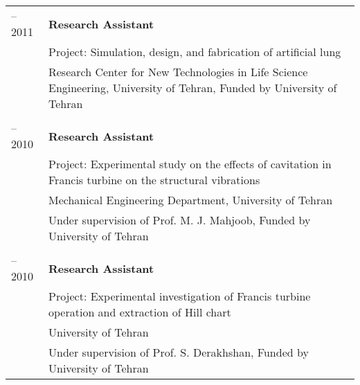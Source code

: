 \begin{longtable}[l]{>{\raggedleft\arraybackslash}p{}|p{}}
    

    2010 -- 2011 & \textbf{Research Assistant} \\
    & Project: Simulation, design, and fabrication of artificial lung \\
    & Research Center for New Technologies in Life Science Engineering, University of Tehran, Funded by University of Tehran \\		
    \multicolumn{2}{c}{} \\
    
    2010 -- 2010 & \textbf{Research Assistant} \\
    & Project: Experimental study on the effects of cavitation in Francis turbine on the structural vibrations \\
    & Mechanical Engineering Department, University of Tehran \\
    & Under supervision of Prof. M. J. Mahjoob, Funded by University of Tehran \\		
    \multicolumn{2}{c}{} \\

    
    2009 -- 2010 & \textbf{Research Assistant} \\
    & Project: Experimental investigation of Francis turbine operation and extraction of Hill chart \\
    & University of Tehran \\
    & Under supervision of Prof. S. Derakhshan, Funded by University of Tehran \\


\end{longtable}
